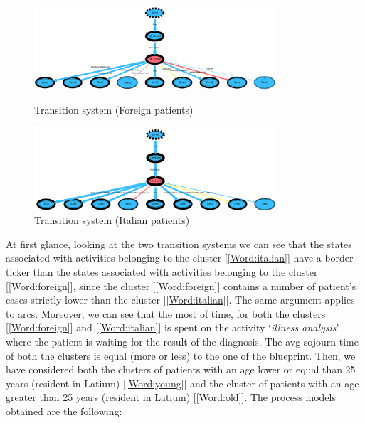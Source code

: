 \begin{figure} [h]
\includegraphics[width=0.8\textwidth]{ProntoSoccorsoSojournForeigns}
\caption{Transition system (Foreign patients)}
\includegraphics[width=0.8\textwidth]{ProntoSoccorsoSojournItalians}
\caption{Transition system (Italian patients)}
\end{figure} \newline
At first glance, looking at the two transition systems we can see that the states associated with activities belonging to the cluster [\ref{Word:italian}] have a border ticker than the states associated with activities belonging to the cluster [\ref{Word:foreign}], since the cluster [\ref{Word:foreign}] contains a number of patient's cases strictly lower than the cluster [\ref{Word:italian}]. The same argument applies to arcs. Moreover, we can see that the most of time, for both the clusters [\ref{Word:foreign}] and [\ref{Word:italian}] is spent on the activity `\textit{illness analysis}' where the patient is waiting for the result of the diagnosis. The avg sojourn time of both the clusters is equal (more or less) to the one of the blueprint. Then, we have considered both the clusters of patients with an age lower or equal than 25 years (resident in Latium) [\ref{Word:young}] and the cluster of patients with an age greater than 25 years (resident in Latium) [\ref{Word:old}]. The process models obtained are the following:
